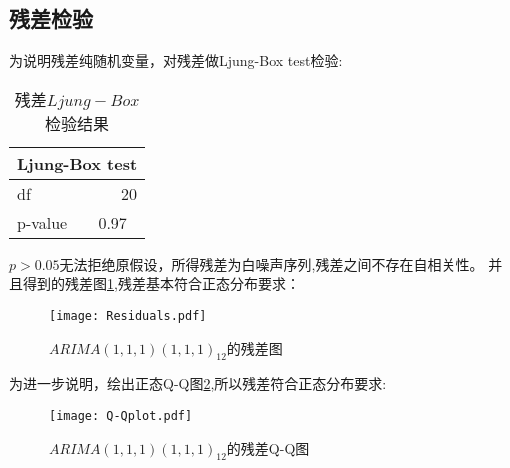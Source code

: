 \documentclass[12pt,a4paper]{nmmcm}
\begin{document}
  \subsection{残差检验}
  为说明残差纯随机变量，对残差做Ljung-Box test检验:
  \begin{table}[H]
    \centering
    \caption{残差\(Ljung-Box\)检验结果}
      \begin{tabular}{ll}
      \multicolumn{2}{c}{Ljung-Box test} \\
      \hline
      df    & \multicolumn{1}{r}{20} \\
      p-value & 0.97 \\
      \end{tabular}%
    \label{Ljung-Box of Residuals}%
  \end{table}%
  \(p>0.05\)无法拒绝原假设，所得残差为白噪声序列,残差之间不存在自相关性。
  并且得到的残差图\ref{Redsiduals},残差基本符合正态分布要求：
  \begin{figure}[H] %
  \centering %
  \texttt{[image: Residuals.pdf]} %
  \caption{\(ARIMA(1,1,1)(1,1,1)_{12}\)的残差图} %
  \label{Redsiduals} %
  \end{figure} 
  为进一步说明，绘出正态Q-Q图\ref{Q-Qplot},所以残差符合正态分布要求:
  \begin{figure}[H] %
    \centering %
    \texttt{[image: Q-Qplot.pdf]} %
    \caption{\(ARIMA(1,1,1)(1,1,1)_{12}\)的残差Q-Q图} %
    \label{Q-Qplot} %
  \end{figure} 
\end{document}
